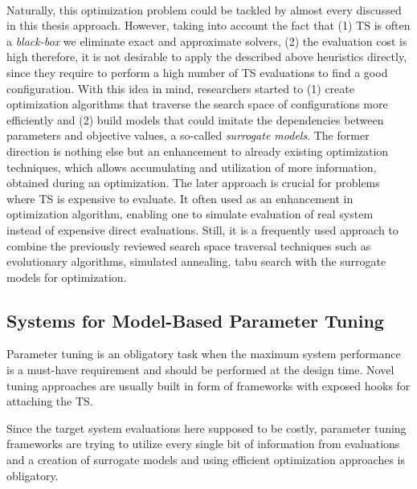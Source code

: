 \paragraph{} Naturally, this optimization problem could be tackled by almost every discussed in this thesis approach. However, taking into account the fact that (1) TS is often a \textit{black-box} we eliminate exact and approximate solvers, (2) the evaluation cost is high therefore, it is not desirable to apply the described above heuristics directly, since they require to perform a high number of TS evaluations to find a good configuration. With this idea in mind, researchers started to (1) create optimization algorithms that traverse the search space of configurations more efficiently and (2) build models that could imitate the dependencies between parameters and objective values, a so-called \textit{surrogate models}. The former direction is nothing else but an enhancement to already existing optimization techniques, which allows accumulating and utilization of more information, obtained during an optimization. The later approach is crucial for problems where TS is expensive to evaluate.
It often used as an enhancement in optimization algorithm, enabling one to simulate evaluation of real system instead of expensive direct evaluations. Still, it is a frequently used approach to combine the previously reviewed search space traversal techniques such as evolutionary algorithms, simulated annealing, tabu search with the surrogate models for optimization.


\subsection{Systems for Model-Based Parameter Tuning}\label{bg: parameter tuning expamples}
Parameter tuning is an obligatory task when the maximum system performance is a must-have requirement and should be performed at the design time.
Novel tuning approaches are usually built in form of frameworks with exposed hooks for attaching the TS.

Since the target system evaluations here supposed to be costly, parameter tuning frameworks are trying to utilize every single bit of information from evaluations and a creation of surrogate models and using efficient optimization approaches is obligatory.

